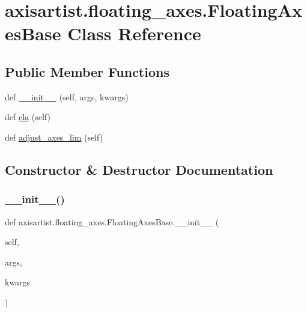 \hypertarget{classaxisartist_1_1floating__axes_1_1FloatingAxesBase}{}\section{axisartist.\+floating\+\_\+axes.\+Floating\+Axes\+Base Class Reference}
\label{classaxisartist_1_1floating__axes_1_1FloatingAxesBase}
\subsection*{Public Member Functions}
\begin{DoxyCompactItemize}
\item 
def \hyperlink{classaxisartist_1_1floating__axes_1_1FloatingAxesBase_ac02d3ee0c09133536959e03287ce1686}{\+\_\+\+\_\+init\+\_\+\+\_\+} (self, args, kwargs)
\item 
def \hyperlink{classaxisartist_1_1floating__axes_1_1FloatingAxesBase_a384ad628275685b01dea3c7c25c4d4c5}{cla} (self)
\item 
def \hyperlink{classaxisartist_1_1floating__axes_1_1FloatingAxesBase_a50dcbc00f97a9fe0655130dd07643321}{adjust\+\_\+axes\+\_\+lim} (self)
\end{DoxyCompactItemize}


\subsection{Constructor \& Destructor Documentation}
\mbox{\label{classaxisartist_1_1floating__axes_1_1FloatingAxesBase_ac02d3ee0c09133536959e03287ce1686}} 
\subsubsection{\texorpdfstring{\+\_\+\+\_\+init\+\_\+\+\_\+()}{\_\_init\_\_()}}
{\footnotesize\ttfamily def axisartist.\+floating\+\_\+axes.\+Floating\+Axes\+Base.\+\_\+\+\_\+init\+\_\+\+\_\+ (\begin{DoxyParamCaption}\item[{}]{self,  }\item[{}]{args,  }\item[{}]{kwargs }\end{DoxyParamCaption})}



